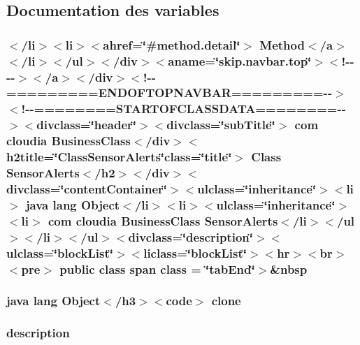 \subsection{Documentation des variables}
\hypertarget{_sensor_alerts_8html_a07d019b7883abb840ab4fc5ba1cca483}{
\subsubsection[{class}]{\setlength{\rightskip}{0pt plus 5cm}$<$/li$>$$<$li$>$$<$ahref=\char`\"{}\#method.\-detail\char`\"{}$>$ Method$<$/{\bf a}$>$$<$/li$>$$<$/ul$>$$<$/div$>$$<$aname=\char`\"{}skip.\-navbar.\-top\char`\"{}$>$$<$!-\/-\/-\/-\/$>$$<$/a$>$$<$/div$>$$<$!-\/-\/=========E\-N\-D\-O\-F\-T\-O\-P\-N\-A\-V\-B\-A\-R=========-\/-\/$>$$<$!-\/-\/========S\-T\-A\-R\-T\-O\-F\-C\-L\-A\-S\-S\-D\-A\-T\-A========-\/-\/$>$$<$divclass=\char`\"{}header\char`\"{}$>$$<$divclass=\char`\"{}sub\-Title\char`\"{}$>$ com cloudia Business\-Class$<$/div$>$$<$h2title=\char`\"{}Class\-Sensor\-Alerts\char`\"{}class=\char`\"{}title\char`\"{}$>$ Class {\bf Sensor\-Alerts}$<$/h2$>$$<$/div$>$$<$divclass=\char`\"{}content\-Container\char`\"{}$>$$<$ulclass=\char`\"{}inheritance\char`\"{}$>$$<$li$>$ java lang Object$<$/li$>$$<$li$>$$<$ulclass=\char`\"{}inheritance\char`\"{}$>$$<$li$>$ com cloudia Business\-Class {\bf Sensor\-Alerts}$<$/li$>$$<$/ul$>$$<$/li$>$$<$/ul$>$$<$divclass=\char`\"{}description\char`\"{}$>$$<$ulclass=\char`\"{}block\-List\char`\"{}$>$$<$liclass=\char`\"{}block\-List\char`\"{}$>$$<$hr$>$$<$br$>$$<$pre$>$ public class {\bf span} class = \char`\"{}tab\-End\char`\"{}$>$\&nbsp}}\label{_sensor_alerts_8html_a07d019b7883abb840ab4fc5ba1cca483}
\hypertarget{_sensor_alerts_8html_adc9607fcabf6f2d7f401ad52015ef6e0}{
\subsubsection[{clone}]{\setlength{\rightskip}{0pt plus 5cm}java lang Object$<$/h3$>$$<$code$>$ clone}}\label{_sensor_alerts_8html_adc9607fcabf6f2d7f401ad52015ef6e0}
\hypertarget{_sensor_alerts_8html_a2661f439a4a94ffdcd5e47ae1da0bb1d}{
\subsubsection[{description}]{\setlength{\rightskip}{0pt plus 5cm}description}}\label{_sensor_alerts_8html_a2661f439a4a94ffdcd5e47ae1da0bb1d}
